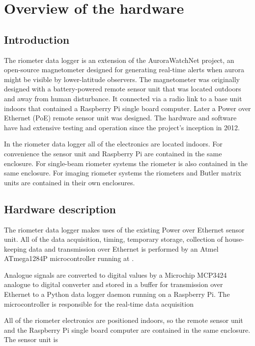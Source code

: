 \chapter{Overview of the hardware}

\section{Introduction}

The riometer data logger is an extension of the AuroraWatchNet project, an
open-source magnetometer designed for generating real-time alerts when aurora
might be visible by lower-latitude observers. The magnetometer was originally
designed with a battery-powered remote sensor unit that was located outdoors and
away from human disturbance. It connected via a radio link to a base unit indoors
that contained a Raspberry Pi single board computer. Later a Power over Ethernet
(PoE) remote sensor unit was designed. The hardware and software have had
extensive testing and operation since the project's inception in 2012. 

In the riometer data logger all of the electronics are located indoors. For
convenience the sensor unit and Raspberry Pi are contained in the same
enclosure. For single-beam riometer systems the riometer is also contained in
the same enclosure. For imaging riometer systems the riometers and Butler matrix
units are contained in their own enclosures.

\section{Hardware description}

The riometer data logger makes uses of the existing Power over Ethernet sensor
unit. All of the data acquisition, timing, temporary storage, collection of
house-keeping data and transmission over Ethernet is performed by an Atmel
ATmega1284P microcontroller running at . 

Analogue signals are converted to digital values by a Microchip MCP3424
analogue to digital converter and stored in a buffer for transmission over
Ethernet to a Python data logger daemon running on a Raspberry Pi. The
microcontroller is responsible for the real-time data acquisition

All of the riometer electronics are positioned indoors, so the remote sensor
unit and the Raspberry Pi single board computer are contained in the same
enclosure. The sensor unit is

